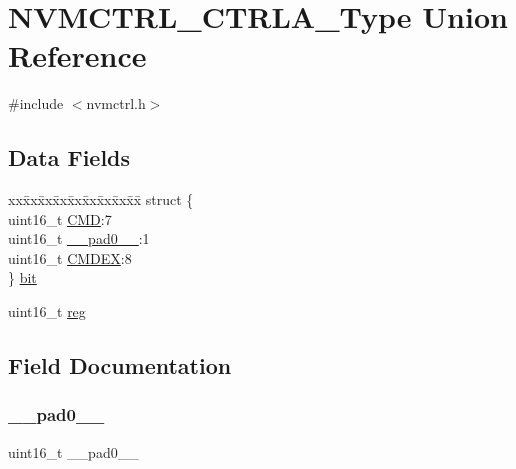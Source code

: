 \hypertarget{union_n_v_m_c_t_r_l___c_t_r_l_a___type}{}\section{N\+V\+M\+C\+T\+R\+L\+\_\+\+C\+T\+R\+L\+A\+\_\+\+Type Union Reference}
\label{union_n_v_m_c_t_r_l___c_t_r_l_a___type}


{\ttfamily \#include $<$nvmctrl.\+h$>$}

\subsection*{Data Fields}
\begin{DoxyCompactItemize}
\item 
\begin{tabbing}
xx\=xx\=xx\=xx\=xx\=xx\=xx\=xx\=xx\=\kill
struct \{\\
\>uint16\_t \mbox{\hyperlink{union_n_v_m_c_t_r_l___c_t_r_l_a___type_a6cd9ec462f42ca73fcc999e944c712c5}{CMD}}:7\\
\>uint16\_t \mbox{\hyperlink{union_n_v_m_c_t_r_l___c_t_r_l_a___type_a77132c2c26a75f5b8751b235cda23828}{\_\_pad0\_\_}}:1\\
\>uint16\_t \mbox{\hyperlink{union_n_v_m_c_t_r_l___c_t_r_l_a___type_abee22c89af9d5f931fec1cf074187b29}{CMDEX}}:8\\
\} \mbox{\hyperlink{union_n_v_m_c_t_r_l___c_t_r_l_a___type_ab6f9e1408e9adabde137007698ba412b}{bit}}\\

\end{tabbing}\item 
uint16\+\_\+t \mbox{\hyperlink{union_n_v_m_c_t_r_l___c_t_r_l_a___type_a11760f5020019f4aa8cb02e694f7cc44}{reg}}
\end{DoxyCompactItemize}


\subsection{Field Documentation}
\mbox{\label{union_n_v_m_c_t_r_l___c_t_r_l_a___type_a77132c2c26a75f5b8751b235cda23828}} 
\subsubsection{\texorpdfstring{\_\_pad0\_\_}{\_\_pad0\_\_}}
{\footnotesize\ttfamily uint16\+\_\+t \+\_\+\+\_\+pad0\+\_\+\+\_\+}

